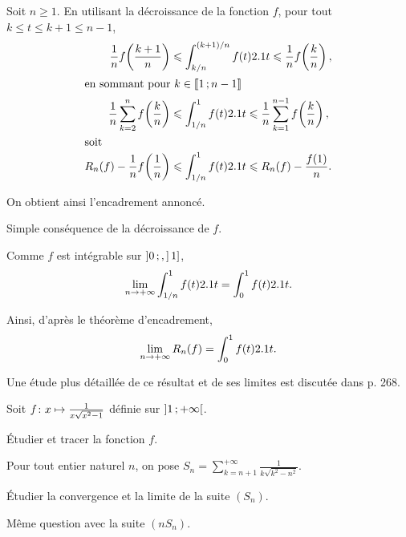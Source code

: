 \begin{elemsolution}
\begin{reponses}
\item Soit $n \geqslant 1$. En utilisant la décroissance de la fonction $f$, pour tout $k \leqslant t \leqslant k + 1 \leqslant n-1$,
\begin{align*}
\frac{1}{n} f\mathopen{}\left(\frac{k+1}{n}\right) &\leqslant \int_{k/n}^{(k+1)/n} f(t) \d t \leqslant \frac{1}{n} f\mathopen{}\left(\frac{k}{n}\right),\\
\intertext{en sommant pour $k \in \interent{1}{n-1}$}
\frac{1}{n} \sum\limits_{k=2}^{n} f\mathopen{}\left(\frac{k}{n}\right) &\leqslant \displaystyle\int_{1/n}^1 f(t) \d t \leqslant \frac{1}{n} \sum\limits_{k=1}^{n-1} f\mathopen{}\left(\frac{k}{n}\right),\\
\intertext{soit}
R_n(f) - \frac{1}{n} f\mathopen{}\left(\frac{1}{n}\right) &\leqslant \displaystyle\int_{1/n}^1 f(t) \d t \leqslant R_n(f) - \frac{f(1)}{n}.
\end{align*}

On obtient ainsi l'encadrement annoncé.

\item Simple conséquence de la décroissance de $f$.

\item Comme $f$ est intégrable sur $\interof0, 1]$,
\[
\lim\limits_{n\to+\infty} \displaystyle\int_{1/n}^1 f(t) \d t = \displaystyle\int_0^1 f(t) \d t.
\]

\item Ainsi, d'après le théorème d'encadrement,
\[
\lim\limits_{n\to+\infty} R_n(f) = \displaystyle\int_0^1 f(t) \d t.
\]
\end{reponses}
\end{elemsolution}

\begin{remarque}
Une étude plus détaillée de ce résultat et de ses limites est discutée dans \cite{truc2019} p. 268.
\end{remarque}


\begin{exercice}
Soit $\fonctionligne[f]{x}{\frac{1}{x \sqrt{x^2 - 1}}}$ définie sur $\interoo{1}{+\infty}$.
\begin{questions}
\item Étudier et tracer la fonction $f$.
\end{questions}
Pour tout entier naturel $n$, on pose $S_n = \sum\limits_{k=n+1}^{+\infty} \frac{1}{k \sqrt{k^2 - n^2}}$.
\begin{questions}[resume]
\item Étudier la convergence et la limite de la suite $(S_n)$.

\item Même question avec la suite $(n S_n)$.
\end{questions}
\end{exercice}

